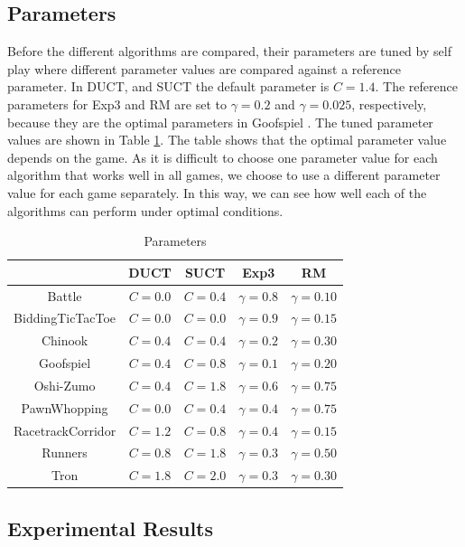 \documentclass[conference]{IEEEtran}
\begin{document}
\subsection{Parameters}
Before the different algorithms are compared, their parameters are tuned by self play where different parameter values are compared against a reference parameter. In DUCT, and SUCT the default parameter is $C=1.4$. The reference parameters for Exp3 and RM are set to $\gamma = 0.2$ and $\gamma = 0.025$, respectively, because they are the optimal parameters in Goofspiel \cite{Lanctot13Goofspiel}. The tuned parameter values are shown in Table \ref{table:parameters}. The table shows that the optimal parameter value depends on the game. As it is difficult to choose one parameter value for each algorithm that works well in all games, we choose to use a different parameter value for each game separately. In this way, we can see how well each of the algorithms can perform under optimal conditions.
\begin{table}[h]
\caption{Parameters}
\label{table:parameters}
\centering
\begin{tabular}{|c|c|c|c|c|}
\hline
                  & DUCT    & SUCT    & Exp3           & RM  \\
\hline
Battle            & $C=0.0$ & $C=0.4$ & $\gamma = 0.8$ & $\gamma = 0.10$  \\ 
BiddingTicTacToe  & $C=0.0$ & $C=0.0$ & $\gamma = 0.9$ & $\gamma = 0.15$   \\ 
Chinook           & $C=0.4$ & $C=0.4$ & $\gamma = 0.2$ & $\gamma = 0.30$ \\ 
Goofspiel         & $C=0.4$ & $C=0.8$ & $\gamma = 0.1$ & $\gamma = 0.20$ \\ 
Oshi-Zumo         & $C=0.4$ & $C=1.8$ & $\gamma = 0.6$ & $\gamma = 0.75$ \\ 
PawnWhopping      & $C=0.0$ & $C=0.4$ & $\gamma = 0.4$ & $\gamma = 0.75$  \\ 
RacetrackCorridor & $C=1.2$ & $C=0.8$ & $\gamma = 0.4$ & $\gamma = 0.15$\\ 
Runners           & $C=0.8$ & $C=1.8$ & $\gamma = 0.3$ & $\gamma = 0.50$ \\
Tron              & $C=1.8$ & $C=2.0$ & $\gamma = 0.3$ & $\gamma = 0.30$ \\
 \hline
\end{tabular}
\end{table}

\subsection{Experimental Results}
\label{subsec:results}
\end{document}
